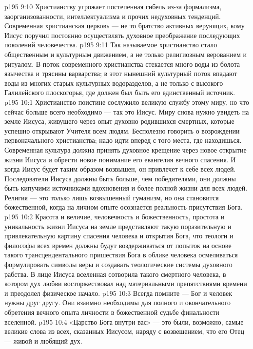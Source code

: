 \vs p195 9:10 Христианству угрожает постепенная гибель из\hyp{}за формализма, заорганизованности, интеллектуализма и прочих недуховных тенденций. Современная христианская церковь --- не то братство активных верующих, кому Иисус поручил постоянно осуществлять духовное преображение последующих поколений человечества.
\vs p195 9:11 Так называемое христианство стало общественным и культурным движением, а не только религиозным верованием и ритуалом. В поток современного христианства стекается много воды из болота язычества и трясины варварства; в этот нынешний культурный поток впадают воды из многих старых культурных водоразделов, а не только с высокого Галилейского плоскогорья, где должен был быть его единственный источник.
\vs p195 10:1 Христианство поистине сослужило великую службу этому миру, но что сейчас больше всего необходимо --- так это Иисус. Миру снова нужно увидеть на земле Иисуса, живущего через опыт духовно родившихся смертных, которые успешно открывают Учителя всем людям. Бесполезно говорить о возрождении первоначального христианства; надо идти вперед с того места, где находишься. Современная культура должна принять духовное крещение через новое открытие жизни Иисуса и обрести новое понимание его евангелия вечного спасения. И когда Иисус будет таким образом возвышен, он привлечет к себе всех людей. Последователи Иисуса должны быть больше, чем победителями, они должны быть кипучими источниками вдохновения и более полной жизни для всех людей. Религия --- это только лишь возвышенный гуманизм, но она становится божественной, когда на личном опыте осознается реальность присутствия Бога.
\vs p195 10:2 Красота и величие, человечность и божественность, простота и уникальность жизни Иисуса на земле представляют такую поразительную и привлекательную картину спасения человека и открытия Бога, что теологи и философы всех времен должны будут воздерживаться от попыток на основе такого трансцендентального пришествия Бога в облике человека осмеливаться формулировать символы веры и создавать теологические системы духовного рабства. В лице Иисуса вселенная сотворила такого смертного человека, в котором дух любви восторжествовал над материальными препятствиями времени и преодолел физическое начало.
\vs p195 10:3 \pc Всегда помните --- Бог и человек нужны друг другу. Они взаимно необходимы для полного и окончательного обретения вечного опыта личности в божественной судьбе финальности вселенной.
\vs p195 10:4 «Царство Бога внутри вас» --- это были, возможно, самые великие слова из всех, сказанных Иисусом, наряду с возвещением, что его Отец --- живой и любящий дух.
